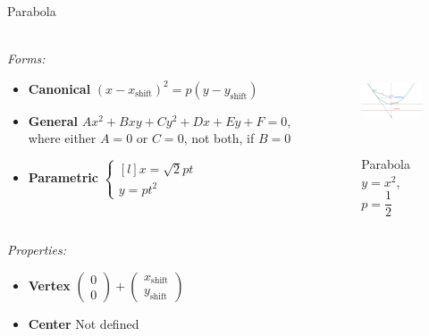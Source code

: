 \documentclass[aspectratio=169]{beamer}
\newcommand{\shf}{\text{shift}}
\begin{document}
\begin{frame}[t]{Parabola}
\framesubtitle{}
    \scriptsize
    \vspace{-0.4cm}
\begin{columns}[T,onlytextwidth]
    \begin{column}{0.59\textwidth}
        \textit{Forms:} \\
\begin{itemize}
    \item \textbf{Canonical} $(x-x_{\shf})^2=p(y-y_{\shf})$
    \item \textbf{General} $Ax^2+Bxy+Cy^2+Dx+Ey+F=0$, where either $A=0$ or $C=0$, not both, if $B=0$
    \item \textbf{Parametric} $\left\{\begin{matrix*}[l] x = \sqrt{2}pt\\ y = pt^2\end{matrix*}\right.$
\end{itemize}
    \end{column}
    \begin{column}{0.39\textwidth}
        \begin{figure}[H]
            \centering\includegraphics[height=3cm,width=1\textwidth,keepaspectratio]{Parabola.png}
            \vspace{-0.5cm}
            \caption*{\scriptsize Parabola $y=x^2$, $p=\dfrac{1}{2}$}
            \label{fig:Parabola.png}
        \end{figure}
    \end{column}
\end{columns}
\vspace{-0.6cm}
\textit{Properties:}
\begin{multicols}{3}
    \begin{itemize}
        \item \textbf{Vertex} $\begin{pmatrix} 0\\0 \end{pmatrix} + \begin{pmatrix} x_{\shf}\\y_{\shf} \end{pmatrix}$
        \item \textbf{Center} Not defined

\end{itemize}
\end{multicols}
\end{frame}
\end{document}
